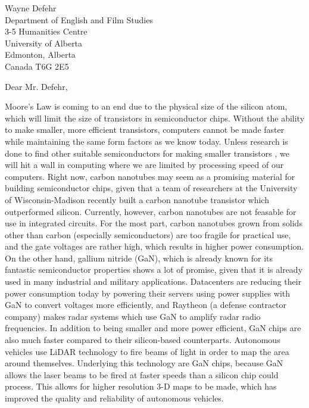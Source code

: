 \documentclass[letterpaper]{letter}
\begin{document}
\begin{letter}
{
Wayne Defehr\\
Department of English and Film Studies\\
3-5 Humanities Centre\\
University of Alberta\\
Edmonton, Alberta\\
Canada T6G 2E5\\
}

\opening{Dear Mr. Defehr,}
\doublespacing

Moore's Law is coming to an end due to the physical size of the silicon atom,
which will limit the size of transistors in semiconductor chips. Without the
ability to make smaller, more efficient transistors, computers cannot be made
faster while maintaining the same form factors as we know today. Unless research
is done to find other suitable semiconductors for making smaller transistors ,
we will hit a wall in computing where we are limited by processing speed of our
computers. Right now, carbon nanotubes may seem as a promising material for
building semiconductor chips, given that a team of researchers at the University
of Wisconsin-Madison recently built a carbon nanotube transistor which
outperformed silicon. Currently, however, carbon nanotubes are not feasable for
use in integrated circuits. For the most part, carbon nanotubes grown from
solids other than carbon (especially semiconductors) are too fragile for
practical use, and the gate voltages are rather high, which results in higher
power consumption. On the other hand, gallium nitride (GaN), which is already
known for its fantastic semiconductor properties shows a lot of promise, given
that it is already used in many industrial and military applications.
Datacenters are reducing their power consumption today by powering their
servers using power supplies with GaN to convert voltages more efficiently,
and Raytheon (a defense contractor company) makes radar systems which use GaN to
amplify radar radio frequencies. In addition to being smaller and more power
efficient, GaN chips are also much faster compared to their silicon-based
counterparts. Autonomous vehicles use LiDAR technology to fire beams of light in
order to map the area around themselves. Underlying this technology are GaN
chips, because GaN allows the laser beams to be fired at faster speeds than a
silicon chip could process. This allows for higher resolution 3-D maps to be
made, which has improved the quality and reliability of autonomous vehicles.

\end{letter}
\end{document}
